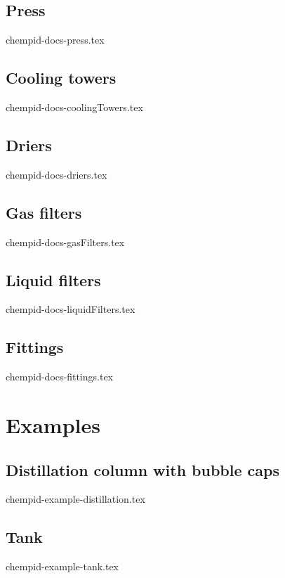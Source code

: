 \documentclass[a4paper, twoside]{article}
\begin{document}
    \subsection{Press}
        {chempid-docs-press.tex}

    \subsection{Cooling towers}
        {chempid-docs-coolingTowers.tex}

    \subsection{Driers}
        {chempid-docs-driers.tex}

    \subsection{Gas filters}
        {chempid-docs-gasFilters.tex}
    
    \subsection{Liquid filters}
        {chempid-docs-liquidFilters.tex}
        
    \subsection{Fittings}
        {chempid-docs-fittings.tex}
    
\newpage
\section{Examples}
    \subsection{Distillation column with bubble caps}
        {chempid-example-distillation.tex}

    \subsection{Tank}
        {chempid-example-tank.tex}
\end{document}
